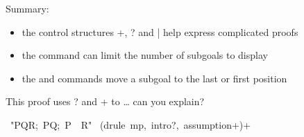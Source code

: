 \medskip
Summary:
\begin{itemize}
\item the control structures \isa+, \isa? and \isa| help express complicated proofs
\item the  command can limit the number of subgoals to display
\item the  and  commands move a 
subgoal to the last or first position
\end{itemize}

\begin{exercise}
This proof uses \isa? and \isa+ to \ldots{} can you explain?
\begin{isabelle}
\ "\isasymlbrakk P\isasymand Q\isasymlongrightarrow R;\ P\isasymlongrightarrow Q;\ P\isasymrbrakk \ \isasymLongrightarrow \ R"\isanewline
{}\ (drule\ mp,\ intro?,\ assumption+)+
\end{isabelle}
\end{exercise}
